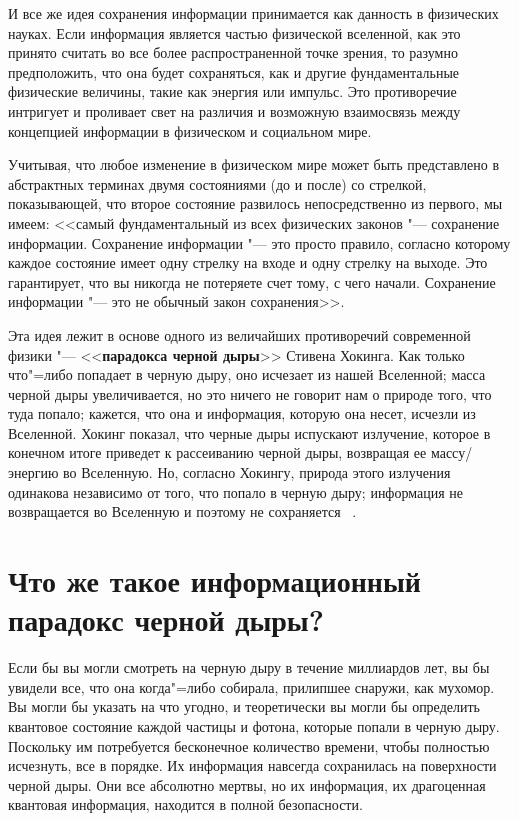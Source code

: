 \documentclass[bachelor, och, referat]{SCWorks}
\begin{document}
И все же идея сохранения информации принимается как данность в физических науках. Если информация является частью физической вселенной, как это принято считать во все более распространенной точке зрения, то разумно предположить, что она будет сохраняться, как и другие фундаментальные физические величины, такие как энергия или импульс. Это противоречие интригует и проливает свет на различия и возможную взаимосвязь между концепцией информации в физическом и социальном мире.

Учитывая, что любое изменение в физическом мире может быть представлено в абстрактных терминах двумя состояниями (до и после) со стрелкой, показывающей, что второе состояние развилось непосредственно из первого, мы имеем: <<самый фундаментальный из всех физических законов "--- сохранение информации. Сохранение информации "--- это просто правило, согласно которому каждое состояние имеет одну стрелку на входе и одну стрелку на выходе. Это гарантирует, что вы никогда не потеряете счет тому, с чего начали. Сохранение информации "--- это не обычный закон сохранения>>.

Эта идея лежит в основе одного из величайших противоречий современной физики "--- <<\textbf{парадокса черной дыры}>> Стивена Хокинга. Как только что"=либо попадает в черную дыру, оно исчезает из нашей Вселенной; масса черной дыры увеличивается, но это ничего не говорит нам о природе того, что туда попало; кажется, что она и информация, которую она несет, исчезли из Вселенной. Хокинг показал, что черные дыры испускают излучение, которое в конечном итоге приведет к рассеиванию черной дыры, возвращая ее массу/энергию во Вселенную. Но, согласно Хокингу, природа этого излучения одинакова независимо от того, что попало в черную дыру; информация не возвращается во Вселенную и поэтому не сохраняется ~\cite{2}.

\section{Что же такое информационный парадокс черной дыры?}

Если бы вы могли смотреть на черную дыру в течение миллиардов лет, вы бы увидели все, что она когда"=либо собирала, прилипшее снаружи, как мухомор. Вы могли бы указать на что угодно, и теоретически вы могли бы определить квантовое состояние каждой частицы и фотона, которые попали в черную дыру. Поскольку им потребуется бесконечное количество времени, чтобы полностью исчезнуть, все в порядке. Их информация навсегда сохранилась на поверхности черной дыры. Они все абсолютно мертвы, но их информация, их драгоценная квантовая информация, находится в полной безопасности.
\end{document}
